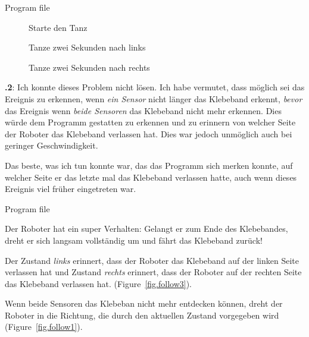 \documentclass[12pt,a4paper,english]{article}
\begin{document}
{\raggedleft \hfill Program file }


\begin{figure}
\begin{center}
\caption{Starte den Tanz}\label{fig.dance-start}
\end{center}
\end{figure}

\begin{figure}
\begin{center}
\caption{Tanze zwei Sekunden nach links}\label{fig.dance-left}
\end{center}
\end{figure}

\begin{figure}
\begin{center}
\caption{Tanze zwei Sekunden nach rechts}\label{fig.dance-right}
\end{center}
\end{figure}

\textbf{\thesection.2}:
Ich konnte dieses Problem nicht lösen. Ich habe vermutet, dass möglich sei das Ereignis zu erkennen, wenn \emph{ein Sensor} nicht länger das Klebeband erkennt, \emph{bevor} das Ereignis wenn \emph{beide Sensoren} das Klebeband nicht mehr erkennen. Dies würde dem Programm gestatten zu erkennen und zu erinnern von welcher Seite der Roboter das Klebeband verlassen hat. Dies war jedoch unmöglich auch bei geringer Geschwindigkeit.

Das beste, was ich tun konnte war, das das Programm sich merken konnte, auf welcher Seite er das letzte mal das Klebeband verlassen hatte, auch wenn dieses Ereignis viel früher eingetreten war.

{\raggedleft \hfill Program file }

Der Roboter hat ein super Verhalten: Gelangt er zum Ende des Klebebandes, dreht er sich langsam vollständig um und fährt das Klebeband zurück! 

Der Zustand \emph{links}   erinnert, dass der Roboter das Klebeband auf der linken Seite verlassen hat und Zustand \emph{rechts}  erinnert, dass der Roboter auf der rechten Seite das Klebeband verlassen hat. (Figure~\ref{fig.follow3}).

Wenn beide Sensoren das Klebeban nicht mehr entdecken können, dreht der Roboter in die Richtung, die durch den aktuellen Zustand vorgegeben wird (Figure~\ref{fig.follow1}).
\end{document}
